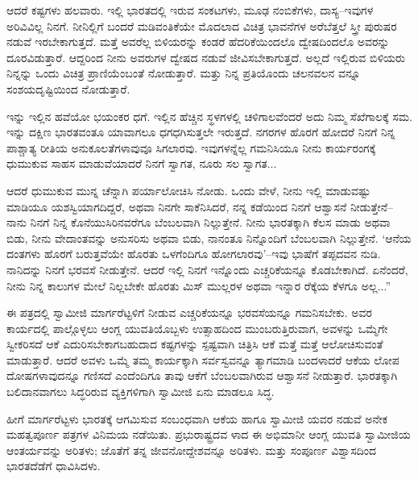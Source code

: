 ಆದರೆ ಕಷ್ಟಗಳು ಹಲವಾರು. ಇಲ್ಲಿ ಭಾರತದಲ್ಲಿ ಇರುವ ಸಂಕಟಗಳು, ಮೂಢ ನಂಬಿಕೆಗಳು, ದಾಸ್ಯ–ಇವುಗಳ ಅರಿವಿವಿಲ್ಲ ನಿನಗೆ. ನೀನಿಲ್ಲಿಗೆ ಬಂದರೆ ಮಡಿವಂತಿಕೆಯೇ ಮೊದಲಾದ ವಿಚಿತ್ರ ಭಾವನೆಗಳ ಅರೆಬೆತ್ತಲೆ ಸ್ತ್ರೀ ಪುರುಷರ ನಡುವೆ ಇರಬೇಕಾಗುತ್ತದೆ. ಮತ್ತೆ ಅವರೆಲ್ಲ ಬಿಳಿಯರನ್ನು ಕಂಡರೆ ಹೆದರಿಕೆಯಿಂದಲೊ ದ್ವೇಷದಿಂದಲೊ ಅವರನ್ನು ದೂರವಿಡುತ್ತಾರೆ. ಆದ್ದರಿಂದ ನೀನು ಅವರುಗಳ ದ್ವೇಷದ ನಡುವೆ ಜೀವಿಸಬೇಕಾಗುತ್ತದೆ. ಅಲ್ಲದೆ ಇಲ್ಲಿರುವ ಬಿಳಿಯರು ನಿನ್ನನ್ನು ಒಂದು ವಿಚಿತ್ರ ಪ್ರಾಣಿಯೆಂಬಂತೆ ನೋಡುತ್ತಾರೆ. ಮತ್ತು ನಿನ್ನ ಪ್ರತಿಯೊಂದು ಚಲನವಲನ ವನ್ನೂ ಸಂಶಯದೃಷ್ಟಿಯಿಂದ ನೋಡುತ್ತಾರೆ.

ಇನ್ನು ಇಲ್ಲಿನ ಹವೆಯೋ ಭಯಂಕರ ಧಗೆ. ಇಲ್ಲಿನ ಹೆಚ್ಚಿನ ಸ್ಥಳಗಳಲ್ಲಿ ಚಳಿಗಾಲವೆಂದರೆ ಅದು ನಿಮ್ಮ ಸೆಖೆಗಾಲಕ್ಕೆ ಸಮ. ಇನ್ನು ದಕ್ಷಿಣ ಭಾರತವಂತೂ ಯಾವಾಗಲೂ ಧಗಧಗಿಸುತ್ತಲೇ ಇರುತ್ತದೆ. ನಗರಗಳ ಹೊರಗೆ ಹೋದರೆ ನಿನಗೆ ನಿನ್ನ ಪಾಶ್ಚಾತ್ಯ ರೀತಿಯ ಅನುಕೂಲತೆಗಳಾವುವೂ ಸಿಗಲಾರವು. ಇವುಗಳನ್ನೆಲ್ಲ ಗಮನಿಸಿಯೂ ನೀನು ಕಾರ್ಯರಂಗಕ್ಕೆ ಧುಮುಕುವ ಸಾಹಸ ಮಾಡುವೆಯಾದರೆ ನಿನಗೆ ಸ್ವಾಗತ, ನೂರು ಸಲ ಸ್ವಾಗತ... 

ಆದರೆ ಧುಮುಕುವ ಮುನ್ನ ಚೆನ್ನಾಗಿ ಪರ್ಯಾಲೋಚಿಸಿ ನೋಡು. ಒಂದು ವೇಳೆ, ನೀನು ಇಲ್ಲಿ ಮಾಡುವಷ್ಟು ಮಾಡಿಯೂ ಯಶಸ್ವಿಯಾಗದಿದ್ದರೆ, ಅಥವಾ ನಿನಗೇ ಸಾಕೆನಿಸಿದರೆ, ನನ್ನ ಕಡೆಯಿಂದ ನಿನಗೆ ಆಶ್ವಾಸನೆ ನೀಡುತ್ತೇನೆ–ನಾನು ನಿನಗೆ ನಿನ್ನ ಕೊನೆಯುಸಿರಿನವರೆಗೂ ಬೆಂಬಲವಾಗಿ ನಿಲ್ಲುತ್ತೇನೆ. ನೀನು ಭಾರತಕ್ಕಾಗಿ ಕೆಲಸ ಮಾಡು ಅಥವಾ ಬಿಡು, ನೀನು ವೇದಾಂತವನ್ನು ಅನುಸರಿಸು ಅಥವಾ ಬಿಡು, ನಾನಂತೂ ನಿನ್ನೊಂದಿಗೆ ಬೆಂಬಲವಾಗಿ ನಿಲ್ಲುತ್ತೇನೆ. ‘ಆನೆಯ ದಂತಗಳು ಹೊರಗೆ ಬರುತ್ತವೆಯೇ ಹೊರತು ಒಳಗೆಂದಿಗೂ ಹೋಗಲಾರವು’–ಇವು ಭಾಷೆಗೆ ತಪ್ಪದವನ ನುಡಿ. ನಾನಿದನ್ನು ನಿನಗೆ ಭರವಸೆ ನೀಡುತ್ತೇನೆ. ಆದರೆ ಇಲ್ಲಿ ನಿನಗೆ ಇನ್ನೊಂದು ಎಚ್ಚರಿಕೆಯನ್ನೂ ಕೊಡಬೇಕಾಗಿದೆ. ಏನೆಂದರೆ, ನೀನು ನಿನ್ನ ಕಾಲುಗಳ ಮೇಲೆ ನಿಲ್ಲಬೇಕೇ ಹೊರತು ಮಿಸ್ ಮುಲ್ಲರಳ ಅಥವಾ ಇನ್ನಾರ ರೆಕ್ಕೆಯ ಕೆಳಗೂ ಅಲ್ಲ...”

ಈ ಪತ್ರದಲ್ಲಿ ಸ್ವಾಮೀಜಿ ಮಾರ್ಗರೆಟ್ಟಳಿಗೆ ನೀಡುವ ಎಚ್ಚರಿಕೆಯನ್ನೂ ಭರವಸೆಯನ್ನೂ ಗಮನಿಸಬೇಕು. ಅವರ ಕಾರ್ಯದಲ್ಲಿ ಪಾಲ್ಗೊಳ್ಳಲು ಆಂಗ್ಲ ಯುವತಿಯೊಬ್ಬಳು ಉತ್ಸಾಹದಿಂದ ಮುಂಬರುತ್ತಿರುವಾಗ, ಅವಳನ್ನು ಒಮ್ಮೆಗೇ ಸ್ವೀಕರಿಸದೆ ಆಕೆ ಎದುರಿಸಬೇಕಾಗಬಹುದಾದ ಕಷ್ಟಗಳನ್ನು ಸ್ಪಷ್ಟವಾಗಿ ಚಿತ್ರಿಸಿ ಆಕೆ ಮತ್ತೆ ಮತ್ತೆ ಆಲೋಚಿಸುವಂತೆ ಮಾಡುತ್ತಾರೆ. ಆದರೆ ಅವಳು ಒಮ್ಮೆ ತಮ್ಮ ಕಾರ್ಯಕ್ಕಾಗಿ ಸರ್ವಸ್ವವನ್ನೂ ತ್ಯಾಗಮಾಡಿ ಬಂದಳಾದರೆ ಆಕೆಯ ಲೋಪ ದೋಷಗಳಾವುದನ್ನೂ ಗಣಿಸದೆ ಎಂದೆಂದಿಗೂ ತಾವು ಆಕೆಗೆ ಬೆಂಬಲವಾಗಿರುವ ಆಶ್ವಾಸನೆ ನೀಡುತ್ತಾರೆ. ಭಾರತಕ್ಕಾಗಿ ಬಲಿದಾನವಾಗಲು ಸಿದ್ಧರಿರುವ ವ್ಯಕ್ತಿಗಳಿಗಾಗಿ ಸ್ವಾಮೀಜಿ ಏನು ಮಾಡಲೂ ಸಿದ್ಧ.

ಹೀಗೆ ಮಾರ್ಗರೆಟ್ಟಳು ಭಾರತಕ್ಕೆ ಆಗಮಿಸುವ ಸಂಬಂಧವಾಗಿ ಆಕೆಯ ಹಾಗೂ ಸ್ವಾಮೀಜಿ ಯವರ ನಡುವೆ ಅನೇಕ ಮಹತ್ವಪೂರ್ಣ ಪತ್ರಗಳ ವಿನಿಮಯ ನಡೆಯಿತು. ಪ್ರಭುರಾಷ್ಟ್ರದವ ಳಾದ ಈ ಅಭಿಮಾನೀ ಆಂಗ್ಲ ಯುವತಿ ಸ್ವಾಮೀಜಿಯ ಆಂತರ್ಯವನ್ನು ಅರಿತಳು; ಜೊತೆಗೆ ತನ್ನ ಜೀವನೋದ್ದೇಶವನ್ನೂ ಅರಿತಳು. ಮತ್ತು ಸಂಪೂರ್ಣ ವಿಶ್ವಾಸದಿಂದ ಭಾರತದೆಡೆಗೆ ಧಾವಿಸಿದಳು.

